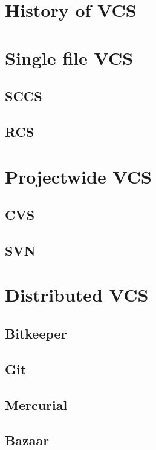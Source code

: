 \documentclass{beamer}
\begin{document}
\section{History of VCS}
\section{Single file VCS}
\subsection{SCCS}
\subsection{RCS}
\section{Projectwide VCS}
\subsection{CVS}
\subsection{SVN}
\section{Distributed VCS}
\subsection{Bitkeeper}
\subsection{Git}
\subsection{Mercurial}
\subsection{Bazaar}
\end{document}
